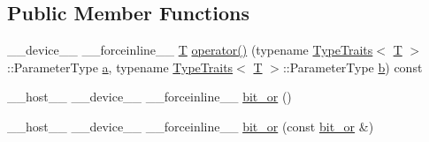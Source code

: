 \subsection*{Public Member Functions}
\begin{DoxyCompactItemize}
\item 
\-\_\-\-\_\-device\-\_\-\-\_\- \-\_\-\-\_\-forceinline\-\_\-\-\_\- \hyperlink{calib3d_8hpp_a3efb9551a871ddd0463079a808916717}{T} \hyperlink{structcv_1_1gpu_1_1device_1_1bit__or_a2e1681b4925da7d6fa292bbd62a3a91a}{operator()} (typename \hyperlink{structcv_1_1gpu_1_1device_1_1TypeTraits}{Type\-Traits}$<$ \hyperlink{calib3d_8hpp_a3efb9551a871ddd0463079a808916717}{T} $>$\-::Parameter\-Type \hyperlink{legacy_8hpp_a1031d0e0a97a340abfe0a6ab9e831045}{a}, typename \hyperlink{structcv_1_1gpu_1_1device_1_1TypeTraits}{Type\-Traits}$<$ \hyperlink{calib3d_8hpp_a3efb9551a871ddd0463079a808916717}{T} $>$\-::Parameter\-Type \hyperlink{legacy_8hpp_ac04272e8ca865b8fba18d36edae9fd2a}{b}) const 
\item 
\-\_\-\-\_\-host\-\_\-\-\_\- \-\_\-\-\_\-device\-\_\-\-\_\- \-\_\-\-\_\-forceinline\-\_\-\-\_\- \hyperlink{structcv_1_1gpu_1_1device_1_1bit__or_ad270a51104f82844f4c8fbd5f4f43cee}{bit\-\_\-or} ()
\item 
\-\_\-\-\_\-host\-\_\-\-\_\- \-\_\-\-\_\-device\-\_\-\-\_\- \-\_\-\-\_\-forceinline\-\_\-\-\_\- \hyperlink{structcv_1_1gpu_1_1device_1_1bit__or_ad2e5ee2957d40872c401e34384554d1c}{bit\-\_\-or} (const \hyperlink{structcv_1_1gpu_1_1device_1_1bit__or}{bit\-\_\-or} \&)
\end{DoxyCompactItemize}


